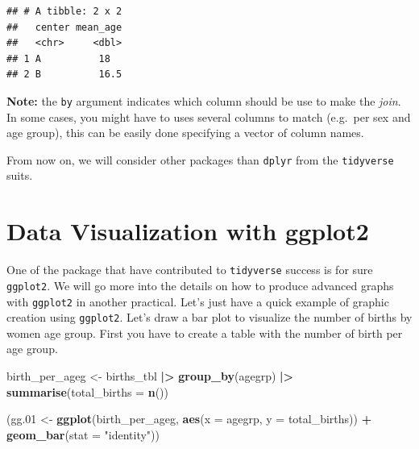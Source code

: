 \documentclass[
]{book}
\newenvironment{Shaded}{\begin{snugshade}}{\end{snugshade}}
\newcommand{\AttributeTok}[1]{\textcolor[rgb]{0.13,0.29,0.53}{#1}}
\newcommand{\FloatTok}[1]{\textcolor[rgb]{0.00,0.00,0.81}{#1}}
\newcommand{\FunctionTok}[1]{\textcolor[rgb]{0.13,0.29,0.53}{\textbf{#1}}}
\newcommand{\NormalTok}[1]{#1}
\newcommand{\OtherTok}[1]{\textcolor[rgb]{0.56,0.35,0.01}{#1}}
\newcommand{\SpecialCharTok}[1]{\textcolor[rgb]{0.81,0.36,0.00}{\textbf{#1}}}
\newcommand{\StringTok}[1]{\textcolor[rgb]{0.31,0.60,0.02}{#1}}
\begin{document}
\begin{verbatim}
## # A tibble: 2 x 2
##   center mean_age
##   <chr>     <dbl>
## 1 A          18  
## 2 B          16.5
\end{verbatim}

\textbf{Note:} the \texttt{by} argument indicates which column should be use to make the \emph{join}. In some
cases, you might have to uses several columns to match (e.g.~per sex and age group), this
can be easily done specifying a vector of column names.

From now on, we will consider other packages than \texttt{dplyr} from the \texttt{tidyverse} suits.

\section{Data Visualization with ggplot2}\label{data-visualization-with-ggplot2}

One of the package that have contributed to \texttt{tidyverse} success is for sure \texttt{ggplot2}.
We will go more into the details on how to produce advanced graphs with \texttt{ggplot2} in another practical.
Let's just have a quick example of graphic creation using \texttt{ggplot2}.
Let's draw a bar plot to visualize the number of births by women age group.
First you have to create a table with the number of birth per age group.

\begin{Shaded}
\begin{Highlighting}[]
\NormalTok{birth\_per\_ageg }\OtherTok{\textless{}{-}}\NormalTok{ births\_tbl }\SpecialCharTok{|\textgreater{}}
  \FunctionTok{group\_by}\NormalTok{(agegrp) }\SpecialCharTok{|\textgreater{}}
  \FunctionTok{summarise}\NormalTok{(}\AttributeTok{total\_births =} \FunctionTok{n}\NormalTok{())}
\end{Highlighting}
\end{Shaded}

\begin{Shaded}
\begin{Highlighting}[]
\NormalTok{(gg}\FloatTok{.01} \OtherTok{\textless{}{-}}
  \FunctionTok{ggplot}\NormalTok{(birth\_per\_ageg, }\FunctionTok{aes}\NormalTok{(}\AttributeTok{x =}\NormalTok{ agegrp, }\AttributeTok{y =}\NormalTok{ total\_births)) }\SpecialCharTok{+}
  \FunctionTok{geom\_bar}\NormalTok{(}\AttributeTok{stat =} \StringTok{"identity"}\NormalTok{))}
\end{Highlighting}
\end{Shaded}
\end{document}

